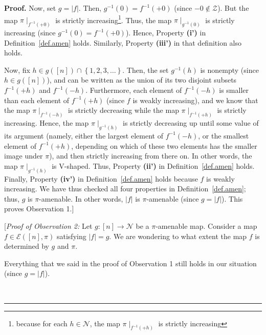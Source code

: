 \documentclass[numbers=enddot,12pt,final,onecolumn,notitlepage]{scrartcl}%
\theoremstyle{definition}
\newenvironment{proof}[1][Proof]{\noindent\textbf{#1.} }{\ \rule{0.5em}{0.5em}}
\newenvironment{vershort}{}{}
\begin{document}
\begin{vershort}
\begin{proof}
Now, set $g=\left\vert f\right\vert $. Then, $g^{-1}\left(  0\right)
=f^{-1}\left(  +0\right)  $ (since $-0\notin\mathcal{Z}$). But the map
$\pi\mid_{f^{-1}\left(  +0\right)  }$ is strictly increasing\footnote{because
for each $h\in\mathcal{N}$, the map $\pi\mid_{f^{-1}\left(  +h\right)  }$ is
strictly increasing}. Thus, the map $\pi\mid_{g^{-1}\left(  0\right)  }$ is
strictly increasing (since $g^{-1}\left(  0\right)  =f^{-1}\left(  +0\right)
$). Hence, Property \textbf{(i')} in Definition~\ref{def.amen} holds.
Similarly, Property \textbf{(iii')} in that definition also holds.

Now, fix $h\in g\left(  \left[  n\right]  \right)  \cap\left\{  1,2,3,\ldots
\right\}  $. Then, the set $g^{-1}\left(  h\right)  $ is nonempty (since $h\in
g\left(  \left[  n\right]  \right)  $), and can be written as the union of its
two disjoint subsets $f^{-1}\left(  +h\right)  $ and $f^{-1}\left(  -h\right)
$. Furthermore, each element of $f^{-1}\left(  -h\right)  $ is smaller than
each element of $f^{-1}\left(  +h\right)  $ (since $f$ is weakly increasing),
and we know that the map $\pi\mid_{f^{-1}\left(  -h\right)  }$ is strictly
decreasing while the map $\pi\mid_{f^{-1}\left(  +h\right)  }$ is strictly
increasing. Hence, the map $\pi\mid_{g^{-1}\left(  h\right)  }$ is strictly
decreasing up until some value of its argument (namely, either the largest
element of $f^{-1}\left(  -h\right)  $, or the smallest
element of $f^{-1}\left(  +h\right)  $, depending on which of these two
elements has the smaller image under $\pi$), and then strictly increasing
from there on. In other words, the map $\pi\mid_{g^{-1}\left(  h\right)  }$ is
V-shaped. Thus, Property \textbf{(ii')} in Definition~\ref{def.amen} holds.
Finally, Property \textbf{(iv')} in Definition~\ref{def.amen} holds because
$f$ is weakly increasing. We have
thus checked all four properties in Definition~\ref{def.amen};
thus, $g$ is $\pi$-amenable.
In other words, $\left| f \right|$ is $\pi$-amenable
(since $g = \left| f \right|$).
This proves Observation 1.]

[\textit{Proof of Observation 2:} Let $g:\left[  n\right]  \rightarrow
\mathcal{N}$ be a $\pi$-amenable map. Consider a map $f\in\mathcal{E}\left(
\left[  n\right]  ,\pi\right)  $ satisfying $\left\vert f\right\vert =g$. We
are wondering to what extent the map $f$ is determined by $g$ and $\pi$.

Everything that we said in the proof of Observation 1 still holds in
our situation (since $g = \left| f \right|$).


\end{proof}
\end{vershort}
\end{document}
